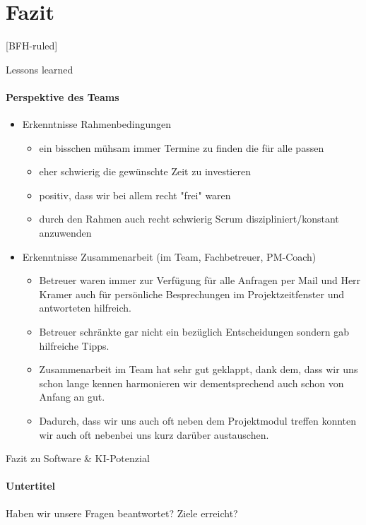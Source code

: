 \documentclass[
    ngerman,%
    authorontitle=true,
]{bfhbeamer}
\begin{document}
    \section{Fazit}\label{sec:fazit}
    [BFH-ruled]
    \frame{\sectionpage}

    \begin{frame}{Lessons learned}
        \framesubtitle{Perspektive des Teams}
        \begin{itemize}
            \item Erkenntnisse Rahmenbedingungen
            \begin{itemize}
                \item ein bisschen mühsam immer Termine zu finden die für alle passen
                \item eher schwierig die gewünschte Zeit zu investieren
                \item positiv, dass wir bei allem recht "frei" waren
                \item durch den Rahmen auch recht schwierig Scrum diszipliniert/konstant anzuwenden
            \end{itemize}
            \item Erkenntnisse Zusammenarbeit (im Team, Fachbetreuer, PM-Coach)
            \begin{itemize}
                \item Betreuer waren immer zur Verfügung für alle Anfragen per Mail und Herr Kramer auch für persönliche Besprechungen im Projektzeitfenster und antworteten hilfreich.
                \item Betreuer schränkte gar nicht ein bezüglich Entscheidungen sondern gab hilfreiche Tipps.
                \item Zusammenarbeit im Team hat sehr gut geklappt, dank dem, dass wir uns schon lange kennen harmonieren wir dementsprechend auch schon von Anfang an gut.
                \item Dadurch, dass wir uns auch oft neben dem Projektmodul treffen konnten wir auch oft nebenbei uns kurz darüber austauschen.
            \end{itemize}
        \end{itemize}
    \end{frame}

    \begin{frame}{Fazit zu Software & KI-Potenzial}
        \framesubtitle{Untertitel}
        Haben wir unsere Fragen beantwortet?
        Ziele erreicht?
    \end{frame}
\end{document}
